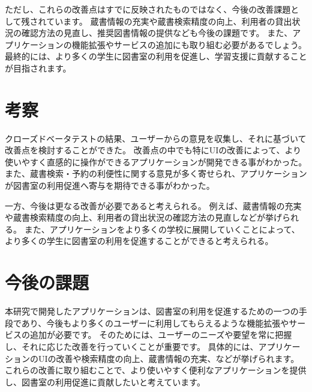 \documentclass[pdflatex,ja=standard,twocolumn]{bxjsarticle}
\begin{document}
ただし、これらの改善点はすでに反映されたものではなく、今後の改善課題として残されています。
蔵書情報の充実や蔵書検索精度の向上、利用者の貸出状況の確認方法の見直し、推奨図書情報の提供なども今後の課題です。
また、アプリケーションの機能拡張やサービスの追加にも取り組む必要があるでしょう。
最終的には、より多くの学生に図書室の利用を促進し、学習支援に貢献することが目指されます。

\section{考察}
クローズドベータテストの結果、ユーザーからの意見を収集し、それに基づいて改善点を検討することができた。
改善点の中でも特にUIの改善によって、より使いやすく直感的に操作ができるアプリケーションが開発できる事がわかった。
また、蔵書検索・予約の利便性に関する意見が多く寄せられ、アプリケーションが図書室の利用促進へ寄与を期待できる事がわかった。

一方、今後は更なる改善が必要であると考えられる。
例えば、蔵書情報の充実や蔵書検索精度の向上、利用者の貸出状況の確認方法の見直しなどが挙げられる。
また、アプリケーションをより多くの学校に展開していくことによって、より多くの学生に図書室の利用を促進することができると考えられる。
\section{今後の課題}
本研究で開発したアプリケーションは、図書室の利用を促進するための一つの手段であり、今後もより多くのユーザーに利用してもらえるような機能拡張やサービスの追加が必要です。
そのためには、ユーザーのニーズや要望を常に把握し、それに応じた改善を行っていくことが重要です。
具体的には、アプリケーションのUIの改善や検索精度の向上、蔵書情報の充実、などが挙げられます。
これらの改善に取り組むことで、より使いやすく便利なアプリケーションを提供し、図書室の利用促進に貢献したいと考えています。
\end{document}

